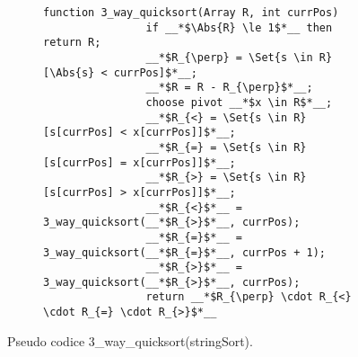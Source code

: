 \documentclass{subfiles}
\begin{document}
\begin{figure}[h!]
    \centering
    \begin{subfigure}[b]{.6\textwidth}
        \begin{lstlisting}[language = PSEUDO]
                function 3_way_quicksort(Array R, int currPos)
                if __*$\Abs{R} \le 1$*__ then return R;
                __*$R_{\perp} = \Set{s \in R}[\Abs{s} < currPos]$*__;
                __*$R = R - R_{\perp}$*__;
                choose pivot __*$x \in R$*__;
                __*$R_{<} = \Set{s \in R}[s[currPos] < x[currPos]]$*__;
                __*$R_{=} = \Set{s \in R}[s[currPos] = x[currPos]]$*__;
                __*$R_{>} = \Set{s \in R}[s[currPos] > x[currPos]]$*__;
                __*$R_{<}$*__ = 3_way_quicksort(__*$R_{>}$*__, currPos);
                __*$R_{=}$*__ = 3_way_quicksort(__*$R_{=}$*__, currPos + 1);
                __*$R_{>}$*__ = 3_way_quicksort(__*$R_{>}$*__, currPos);
                return __*$R_{\perp} \cdot R_{<} \cdot R_{=} \cdot R_{>}$*__
            \end{lstlisting}
    \end{subfigure}
    \caption{Pseudo codice 3\_way\_quicksort(stringSort).}
    \label{Fig:5}
\end{figure}
\end{document}
